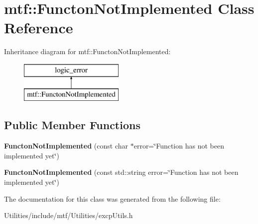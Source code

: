 \hypertarget{classmtf_1_1FunctonNotImplemented}{\section{mtf\-:\-:Functon\-Not\-Implemented Class Reference}
\label{classmtf_1_1FunctonNotImplemented}
}
Inheritance diagram for mtf\-:\-:Functon\-Not\-Implemented\-:\begin{figure}[H]
\begin{center}
\leavevmode
\includegraphics[height=2.000000cm]{classmtf_1_1FunctonNotImplemented}
\end{center}
\end{figure}
\subsection*{Public Member Functions}
\begin{DoxyCompactItemize}
\item 
\hypertarget{classmtf_1_1FunctonNotImplemented_a5d53fa2a20b54c24700afb6f1342ec39}{{\bfseries Functon\-Not\-Implemented} (const char $\ast$error=\char`\"{}Function has not been implemented yet\char`\"{})}\label{classmtf_1_1FunctonNotImplemented_a5d53fa2a20b54c24700afb6f1342ec39}

\item 
\hypertarget{classmtf_1_1FunctonNotImplemented_a12902351f1906e28b1fe9cad7190252a}{{\bfseries Functon\-Not\-Implemented} (const std\-::string error=\char`\"{}Function has not been implemented yet\char`\"{})}\label{classmtf_1_1FunctonNotImplemented_a12902351f1906e28b1fe9cad7190252a}

\end{DoxyCompactItemize}


The documentation for this class was generated from the following file\-:\begin{DoxyCompactItemize}
\item 
Utilities/include/mtf/\-Utilities/excp\-Utils.\-h\end{DoxyCompactItemize}
